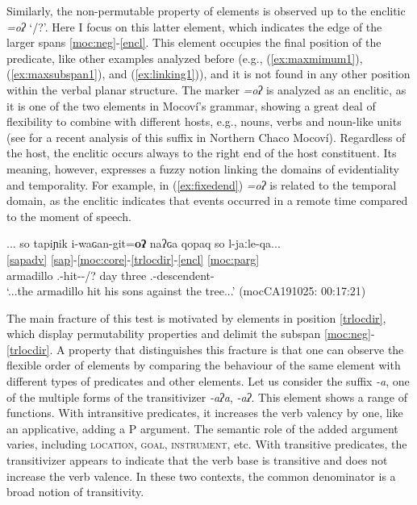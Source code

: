 \documentclass[output=paper]{langscibook}
\begin{document}
 Similarly, the non-permutable property of elements is observed up to the enclitic \textit{=oʔ} {`\Tprl/\Evid?'}. Here I focus on this latter element, which indicates the edge of the larger spans \ref{moc:neg}-\ref{encl}. This element occupies the final position of the predicate, like other examples analyzed before (e.g., (\ref{ex:maxmimum1}), (\ref{ex:maxsubspan1}), and (\ref{ex:linking1})), and it is not found in any other position within the verbal planar structure. The marker \textit{=oʔ} is analyzed as an enclitic, as it is one of the two elements in Mocoví's grammar, showing a great deal of flexibility to combine with different hosts, e.g., nouns, verbs and noun-like units (see  \citealt{Juarez2022} for a recent analysis of this suffix in Northern Chaco Mocoví). Regardless of the host, the enclitic occurs always to the right end of the host constituent. Its meaning, however, expresses a fuzzy notion linking the domains of evidentiality and temporality. For example, in (\ref{ex:fixedend}) \textit{=oʔ} is related to the temporal domain, as the enclitic indicates that events occurred in a remote time compared to the moment of speech. 
 
 \ea\label{ex:fixedend}
 \glll ... so tapiɲik i-waɢan-git=\textbf{oʔ} naʔɢa qopaq so l-jaːle-qa...\\
 {} \ref{sapadv} {} \ref{sap}-\ref{moc:core}-\ref{trlocdir}-\ref{encl} {} \ref{moc:parg} \\
 {} {\DetTwo} armadillo {\Third.\II}-hit-{\LocThree}-{\Evid/\Tprl}? day three {\DetTwo} {\Third.\Poss}-descendent-{\Pl}\\
 \glt `...the armadillo hit his sons against the tree...' 
 \hfill (mocCA191025: 00:17:21)
\z 

The main fracture of this test is motivated by elements in position \ref{trlocdir}, which display permutability properties and delimit the subspan \ref{moc:neg}-\ref{trlocdir}. A property that distinguishes this fracture is that one can observe the flexible order of elements by comparing the behaviour of the same element with different types of predicates and other elements. Let us consider the suffix \textit{-a}, one of the multiple forms of the transitivizer \textit{-aʔa}, \textit{-aʔ}. This element shows a range of functions. With intransitive predicates, it increases the verb valency by one, like an applicative, adding a P argument. The semantic role of the added argument varies, including \textsc{location}, \textsc{goal}, \textsc{instrument}, etc. With transitive predicates, the transitivizer appears to indicate that the verb base is transitive and does not increase the verb valence. In these two contexts, the common denominator is a broad notion of transitivity.
 
\end{document}
